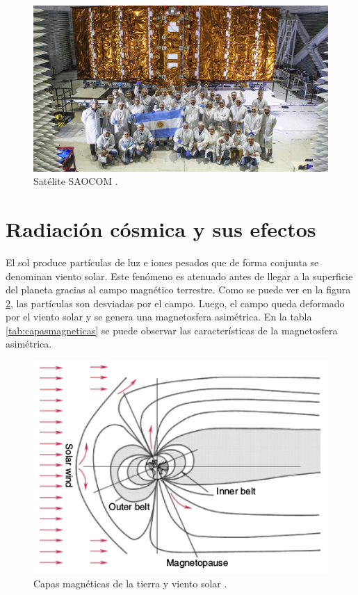 \begin{figure}[htbp]
	\centering
	\includegraphics[width=\textwidth]{./Figures/invapsaocom.jpg}
	\caption{Satélite SAOCOM \citep{WEBSITE:invap}.}
	\label{fig:saocom}
\end{figure}

\section{Radiación cósmica y sus efectos}
\label{sec:radiacion}

El sol produce partículas de luz e iones pesados que de forma conjunta se denominan viento solar.
Este fenómeno es atenuado antes de llegar a la superficie del planeta gracias al campo magnético terrestre.
Como se puede ver en la figura \ref{fig:viento}, las partículas son desviadas por el campo.
Luego, el campo queda deformado por el viento solar y se genera una magnetosfera asimétrica.
En la tabla \ref{tab:capasmagneticas} se puede observar las características de la magnetosfera asimétrica.

\begin{figure}[htbp]
	\centering
	\includegraphics[width=\textwidth]{./Figures/vientosolar.jpg}
    \caption{Capas magnéticas de la tierra y viento solar \citep{WEBSITE:structure_space_radiation}.}
	\label{fig:viento}
\end{figure}

